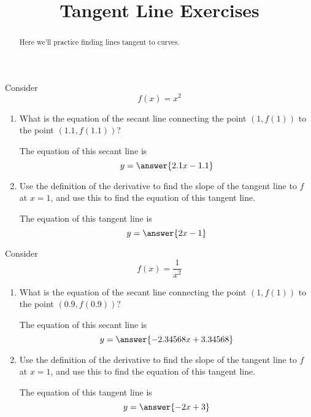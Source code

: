 \documentclass[handout]{ximera}
\title[Exercises:]{Tangent Line Exercises}
\begin{document}
\begin{abstract}
  Here we'll practice finding lines tangent to curves.
\end{abstract}
\maketitle

\begin{problem}
Consider 
\[
f(x) = x^2
\]

\begin{enumerate}
\item What is the equation of the secant line connecting the point $(1,f(1))$ to the point $(1.1,f(1.1))$? 
\begin{prompt} 
The equation of this secant line is
$$ y = \answer{ 2.1x - 1.1}$$ 
\end{prompt}

\item  Use the definition of the derivative to find the slope of the tangent line to $f$ at $x=1$, and use this to find the equation of this tangent line.

\begin{prompt} 
The equation of this tangent line is
$$ y = \answer{2x - 1}$$ 
\end{prompt}

\end{enumerate}


\end{problem}

\begin{exercise}
Consider 
\[
f(x) = \frac{1}{x^2}
\]

\begin{enumerate}
\item What is the equation of the secant line connecting the point $(1,f(1))$ to the point $(0.9,f(0.9))$? 
\begin{prompt} 
The equation of this secant line is
$$ y = \answer{ -2.34568x+ 3.34568}$$ 
\end{prompt}

\item  Use the definition of the derivative to find the slope of the tangent line to $f$ at $x=1$, and use this to find the equation of this tangent line.

\begin{prompt} 
The equation of this tangent line is
$$ y = \answer{ -2x + 3}$$ 
\end{prompt}

\end{enumerate}

\end{exercise}
\end{document}
